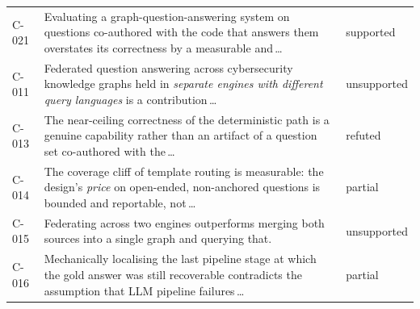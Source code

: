 \begin{tabular}{@{}L{0.08\textwidth}L{0.62\textwidth}L{0.18\textwidth}@{}}
C-021 & Evaluating a graph-question-answering system on questions co-authored with the code that answers them overstates its correctness by a measurable and\,\ldots & supported \\
C-011 & Federated question answering across cybersecurity knowledge graphs held in \emph{separate engines with different query languages} is a contribution\,\ldots & unsupported \\
C-013 & The near-ceiling correctness of the deterministic path is a genuine capability rather than an artifact of a question set co-authored with the\,\ldots & refuted \\
C-014 & The coverage cliff of template routing is measurable: the design's \emph{price} on open-ended, non-anchored questions is bounded and reportable, not\,\ldots & partial \\
C-015 & Federating across two engines outperforms merging both sources into a single graph and querying that. & unsupported \\
C-016 & Mechanically localising the last pipeline stage at which the gold answer was still recoverable contradicts the assumption that LLM pipeline failures\,\ldots & partial \\
\bottomrule
\end{tabular}
